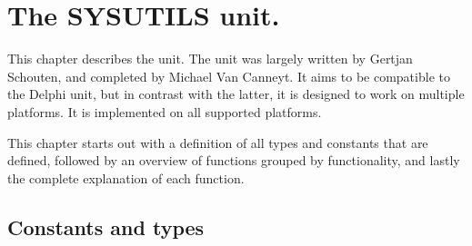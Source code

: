 %
%
%
%
%
\chapter{The SYSUTILS unit.}

This chapter describes the  unit. The  unit 
was largely written by Gertjan Schouten, and completed by Michael Van Canneyt. 
It aims to be compatible to the Delphi  unit, but in contrast 
with  the latter, it is designed to work on multiple platforms. It is implemented
on all supported platforms.

This chapter starts out with a definition of all types and constants 
that are defined, followed by an overview of functions grouped by
functionality, and lastly the complete explanation of each function.

\section{Constants and types}

